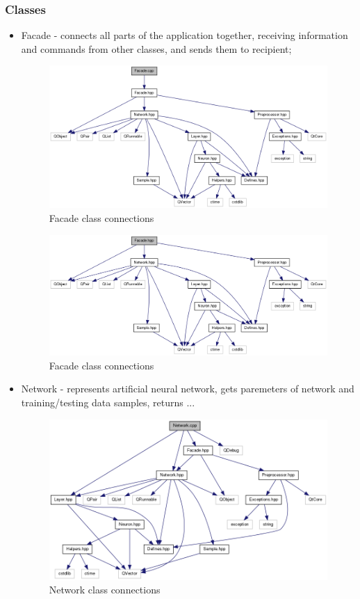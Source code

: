 \documentclass[a4paper,12pt]{article}
\begin{document}
\subsubsection{Classes}
\begin{itemize}
 \item Facade - connects all parts of the application together, receiving information and commands from other classes, and sends them to recipient;
 \begin{figure}[ht]
 \centering
 \includegraphics[scale=0.4]{images/facadecppincl.png}
 \caption{Facade class connections}
\end{figure}

 \begin{figure}[ht]
 \centering
 \includegraphics[scale=0.4]{images/facadehppincl.png}
 \caption{Facade class connections}
\end{figure}

\item Network - represents artificial neural network, gets paremeters of network and training/testing data samples, returns ...

 \begin{figure}[ht]
 \centering
 \includegraphics[scale=0.5]{images/networkcppincl.png}
 \caption{Network class connections}
\end{figure}


\end{itemize}
\end{document}
